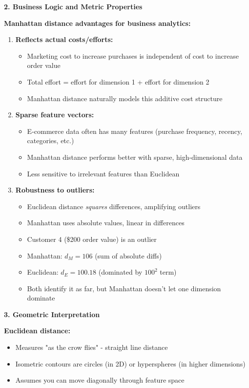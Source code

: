 \documentclass[12pt]{article}
\begin{document}
\begin{explanation}
\textbf{2. Business Logic and Metric Properties}

\textbf{Manhattan distance advantages for business analytics:}

\begin{enumerate}
    \item \textbf{Reflects actual costs/efforts:}
    \begin{itemize}
        \item Marketing cost to increase purchases is independent of cost to increase order value
        \item Total effort = effort for dimension 1 + effort for dimension 2
        \item Manhattan distance naturally models this additive cost structure
    \end{itemize}

    \item \textbf{Sparse feature vectors:}
    \begin{itemize}
        \item E-commerce data often has many features (purchase frequency, recency, categories, etc.)
        \item Manhattan distance performs better with sparse, high-dimensional data
        \item Less sensitive to irrelevant features than Euclidean
    \end{itemize}

    \item \textbf{Robustness to outliers:}
    \begin{itemize}
        \item Euclidean distance \textit{squares} differences, amplifying outliers
        \item Manhattan uses absolute values, linear in differences
        \item Customer 4 (\$200 order value) is an outlier
        \item Manhattan: \(d_M = 106\) (sum of absolute diffs)
        \item Euclidean: \(d_E = 100.18\) (dominated by \(100^2\) term)
        \item Both identify it as far, but Manhattan doesn't let one dimension dominate
    \end{itemize}
\end{enumerate}

\textbf{3. Geometric Interpretation}

\textbf{Euclidean distance:}
\begin{itemize}
    \item Measures "as the crow flies" - straight line distance
    \item Isometric contours are circles (in 2D) or hyperspheres (in higher dimensions)
    \item Assumes you can move diagonally through feature space
\end{itemize}


\end{explanation}
\end{document}

